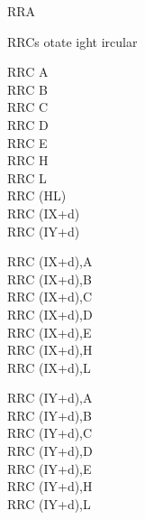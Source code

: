 \begin{basedescript}{
	\desclabelstyle{\multilinelabel}
	\desclabelwidth{3cm}}
\begin{DetailItem}{RRA}{}
		\begin{DetailEffectsFlags}
		\end{DetailEffectsFlags}

		\begin{DetailTiming}
		\end{DetailTiming}

	\end{DetailItem}


	\begin{DetailItem}{RRC}{s}
		{otate ight ircular}
		{}

		\begin{DetailVariants}
			RRC A\\
			RRC B\\
			RRC C\\
			RRC D\\
			RRC E\\
			RRC H\\
			RRC L\\
			RRC (HL)\\
			RRC (IX+d)\\
			RRC (IY+d)

			\columnbreak
			RRC (IX+d),A\UNDOC\\
			RRC (IX+d),B\UNDOC\\
			RRC (IX+d),C\UNDOC\\
			RRC (IX+d),D\UNDOC\\
			RRC (IX+d),E\UNDOC\\
			RRC (IX+d),H\UNDOC\\
			RRC (IX+d),L\UNDOC

			\columnbreak
			RRC (IY+d),A\UNDOC\\
			RRC (IY+d),B\UNDOC\\
			RRC (IY+d),C\UNDOC\\
			RRC (IY+d),D\UNDOC\\
			RRC (IY+d),E\UNDOC\\
			RRC (IY+d),H\UNDOC\\
			RRC (IY+d),L\UNDOC
		\end{DetailVariants}


\end{DetailItem}
\end{basedescript}
